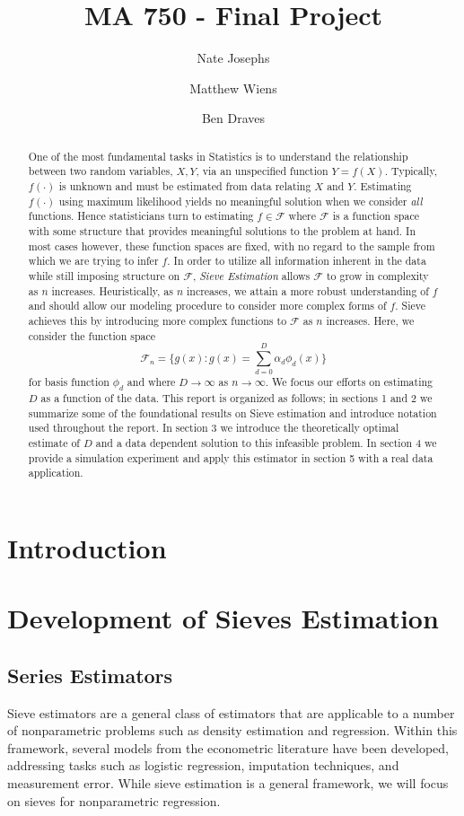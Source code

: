 \documentclass[12pt]{article}  %
\title{MA 750 - Final Project}
\author{
  Nate Josephs\\
  \and
  Matthew Wiens 
  \and 
  Ben Draves
}
\begin{document}
\maketitle 
\begin{abstract} One of the most fundamental tasks in Statistics is to understand the relationship between two random variables, $X,Y$, via an unspecified function $Y = f(X)$. Typically, $f(\cdot)$ is unknown and must be estimated from data relating $X$ and $Y$. Estimating $f(\cdot)$ using maximum likelihood yields no meaningful solution when we consider \textit{all} functions. Hence statisticians turn to estimating $f\in\mathcal{F}$ where $\mathcal{F}$ is a function space with some structure that provides meaningful
solutions to the problem at hand. In most cases however, these function spaces are fixed, with no regard to the sample from which we are trying to infer $f$. In order to utilize all information inherent in the data while still imposing structure on $\mathcal{F}$, \textit{Sieve Estimation} allows $\mathcal{F}$ to grow in complexity as $n$ increases. Heuristically, as $n$ increases, we attain a more robust understanding of $f$ and should allow our modeling procedure to consider more complex forms of $f$. Sieve achieves this by introducing more complex functions to $\mathcal{F}$ as $n$ increases. Here, we consider the function space $$\mathcal{F}_n = \Big\{g(x): g(x) = \sum_{d=0}^{D}\alpha_d\phi_d(x)\Big\}$$ for basis function $\phi_d$ and where $D\to\infty$ as $n\to\infty$. We focus our efforts on estimating $D$ as a function of the data. This report is organized as follows; in sections 1 and 2 we summarize some of the foundational results on Sieve estimation and introduce notation used throughout the report. In section 3 we introduce the theoretically optimal estimate of $D$ and a data dependent solution to this infeasible problem. In section 4 we provide a simulation experiment and apply this estimator in section 5 with a real data application. 
\end{abstract}

\section{Introduction}
\section{Development of Sieves Estimation}

\subsection{Series Estimators}
Sieve estimators are a general class of estimators that are applicable to a number of nonparametric problems such as density estimation and regression. Within this framework, several models from the econometric literature have been developed, addressing tasks such as logistic regression, imputation techniques, and measurement error. While sieve estimation is a general framework, we will focus on sieves for nonparametric regression. 
\end{document}
